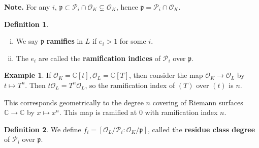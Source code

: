 \documentclass{article}
\theoremstyle{definition}
\newtheorem{example}{Example}[section]
\newtheorem{defn}{Definition}[section]
\begin{document}
\textbf{Note.} For any $i$, $\mathfrak{p} \subset \mathcal{P}_i \cap \mathcal{O}_K \subsetneq \mathcal{O}_K$, hence $\mathfrak{p} = \mathcal{P}_i \cap \mathcal{O}_K$.

\begin{defn}
    \begin{enumerate}[(i)]
        \item We say $\mathfrak{p}$ \textbf{ramifies} in $L$ if $e_i>1$ for some $i$.
        \item The $e_i$ are called the \textbf{ramification indices} of $\mathcal{P}_i$ over $\mathfrak{p}$.
    \end{enumerate}
\end{defn}
\begin{example}
    If $\mathcal{O}_K=\mathbb{C}[t], \mathcal{O}_L=\mathbb{C}[T]$, then consider the map $\mathcal{O}_K \to \mathcal{O}_L$ by $t \mapsto T^n$. Then $t \mathcal{O}_L = T^n \mathcal{O}_L$, so the ramification index of $(T)$ over $(t)$ is $n$.
    \vspace{1mm}
     
    This corresponds geometrically to the degree $n$ covering of Riemann surfaces $\mathbb{C} \to \mathbb{C}$ by $x \mapsto x^n$. This map is ramified at $0$ with ramification index $n$.
\end{example}

\begin{defn}
    We define $f_i = [\mathcal{O}_L/\mathcal{P}_i : \mathcal{O}_K/\mathfrak{p}]$, called the \textbf{residue class degree} of $\mathcal{P}_i$ over $\mathfrak{p}$.
\end{defn}
\end{document}

